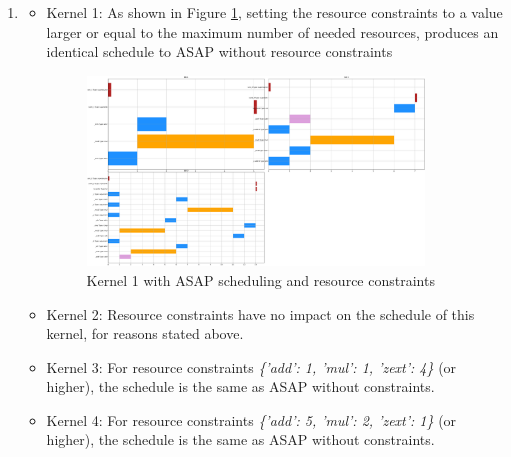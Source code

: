 \documentclass{article}
\begin{document}
\begin{enumerate}
\begin{itemize}
\begin{itemize}
                \item Setting the resource constraints to the highest necessary, i.e. \emph{\{'add': 5, 'mul': 2, 'zext': 1\}} for this kernel, leads to the lowest achievable latency of 22.
            \end{itemize}
        \end{itemize}
        \item
        \begin{itemize}
            \item Kernel 1: As shown in Figure \ref{fig:kernel1-asap-rconst}, setting the resource constraints to a value larger or equal to the maximum number of needed resources, produces an identical schedule to ASAP without resource constraints
                \begin{figure}[H]
                    \centering
                    \includegraphics[width=0.9\textwidth]{figures/asap_kernel_1.pdf}
                    \caption{Kernel 1 with ASAP scheduling and resource constraints}
                    \label{fig:kernel1-asap-rconst}
                \end{figure}
            \item Kernel 2: Resource constraints have no impact on the schedule of this kernel, for reasons stated above.
            \item Kernel 3: For resource constraints \emph{\{'add': 1, 'mul': 1, 'zext': 4\}} (or higher), the schedule is the same as ASAP without constraints.
            \item Kernel 4: For resource constraints \emph{\{'add': 5, 'mul': 2, 'zext': 1\}} (or higher), the schedule is the same as ASAP without constraints.
        \end{itemize}
    \end{enumerate}
\end{document}

